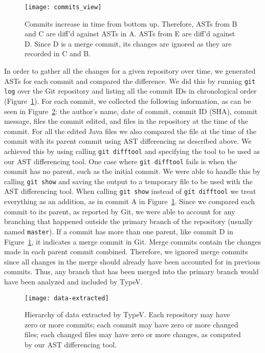 \begin{figure}[h]
\centering
\texttt{[image: commits\_view]}
\caption{Commits increase in time from bottom up. Therefore, ASTs from B and C are diff'd against ASTs in A. ASTs from E are diff'd against D. Since D is a merge commit, its changes are ignored as they are recorded in C and B.}
\label{fig:commits}
\end{figure}

In order to gather all the changes for a given repository over time, we generated ASTs for each commit and compared the difference. We did this by running \texttt{git log} over the Git repository and listing all the commit IDs in chronological order (Figure~\ref{fig:commits}). For each commit, we collected the following information, as can be seen in Figure~\ref{fig:data-extracted}: the author's name, date of commit, commit ID (SHA), commit message, files the commit edited, and files in the repository at the time of the commit. For all the edited Java files we also compared the file at the time of the commit with its parent commit using AST differencing as described above. We achieved this by using calling \texttt{git difftool} and specifying the tool to be used as our AST differencing tool. One case where \texttt{git difftool} fails is when the commit has no parent, such as the initial commit. We were able to handle this by calling \texttt{git show} and saving the output to a temporary file to be used with the AST differencing tool. When calling \texttt{git show} instead of \texttt{git difftool} we treat everything as an addition, as in commit A in Figure~\ref{fig:commits}. Since we compared each commit to its parent, as reported by Git, we were able to account for any branching that happened outside the primary branch of the repository (usually named \texttt{master}). If a commit has more than one parent, like commit D in Figure~\ref{fig:commits}, it indicates a merge commit in Git. Merge commits contain the changes made in each parent commit combined. Therefore, we ignored merge commits since all changes in the merge should already have been accounted for in previous commits. Thus, any branch that has been merged into the primary branch would have been analyzed and included by TypeV.

\begin{figure}[h]
\centering
\texttt{[image: data-extracted]}
\caption{Hierarchy of data extracted by TypeV. Each repository may have zero or more commits; each commit may have zero or more changed files; each changed files may have zero or more changes, as computed by our AST differencing tool.}
\label{fig:data-extracted}
\end{figure}

